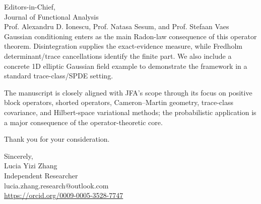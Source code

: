 \documentclass[11pt]{letter}
\begin{document}
\begin{letter}{Editors-in-Chief, \\ Journal of Functional Analysis\\
Prof. Alexandru D. Ionescu, Prof. Natasa Sesum, and Prof. Stefaan Vaes}
Gaussian conditioning enters as the main Radon-law consequence of this operator theorem.  Disintegration supplies the exact-evidence measure, while Fredholm determinant/trace cancellations identify the finite part.  We also include a concrete 1D elliptic Gaussian field example to demonstrate the framework in a standard trace-class/SPDE setting.

The manuscript is closely aligned with JFA’s scope through its focus on positive block operators, shorted operators, Cameron--Martin geometry, trace-class covariance, and Hilbert-space variational methods; the probabilistic application is a major consequence of the operator-theoretic core.

Thank you for your consideration.

\closing{Sincerely,\\
Lucia Yizi Zhang \\
Independent Researcher\\
lucia.zhang.research@outlook.com\\
{\small\mbox{\href{https://orcid.org/0009-0005-3528-7747}{https://orcid.org/0009-0005-3528-7747}}}}

\end{letter}
\end{document}
